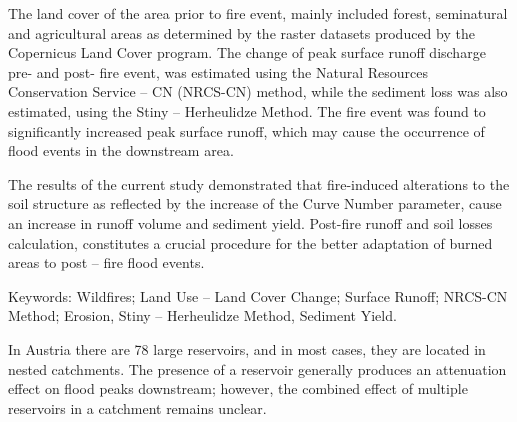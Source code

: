 The land cover of the area prior to fire event, mainly included forest, seminatural and agricultural areas as determined by the raster datasets produced by the Copernicus Land Cover program. The change of peak surface runoff discharge pre- and post- fire event, was estimated using the Natural Resources Conservation Service – CN (NRCS-CN) method, while the sediment loss was also estimated, using the Stiny – Herheulidze Method. The fire event was found to significantly increased peak surface runoff, which may cause the occurrence of flood events in the downstream area. 

The results of the current study demonstrated that fire-induced alterations to the soil structure as reflected by the increase of the Curve Number parameter, cause an increase in runoff volume and sediment yield. Post-fire runoff and soil losses calculation, constitutes a crucial procedure for the better adaptation of burned areas to post – fire flood events. 

Keywords: Wildfires; Land Use – Land Cover Change; Surface Runoff; NRCS-CN Method; Erosion, Stiny – Herheulidze Method, Sediment Yield.
\newpage{}
{}
\begin{flushleft}






\end{flushleft}

\noindent

In Austria there are 78 large reservoirs, and in most cases, they are located in nested catchments. The presence of a reservoir generally produces an attenuation effect on flood peaks downstream; however, the combined effect of multiple reservoirs in a catchment remains unclear. 

